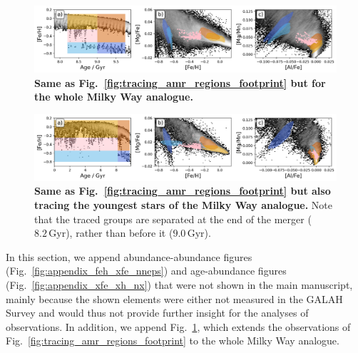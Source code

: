 \documentclass[fleqn,usenatbib]{mnras}
\begin{document}
\begin{figure}
	\includegraphics[width=\textwidth]{figures/tracing_amr_regions_whole.png}
    \caption{
    \textbf{Same as Fig.~\ref{fig:tracing_amr_regions_footprint} but for the whole Milky Way analogue.}
    }
    \label{fig:tracing_amr_regions_whole}
\end{figure}

\begin{figure}
	\includegraphics[width=\textwidth]{figures/tracing_amr_regions_disk.png}
    \caption{
    \textbf{Same as Fig.~\ref{fig:tracing_amr_regions_footprint} but also tracing the youngest stars of the Milky Way analogue.} Note that the traced groups are separated at the end of the merger ($8.2\,\mathrm{Gyr}$), rather than before it ($9.0\,\mathrm{Gyr}$).
    }
    \label{fig:tracing_amr_regions_disk}
\end{figure}

In this section, we append abundance-abundance figures (Fig.~\ref{fig:appendix_feh_xfe_nneps}) and age-abundance figures (Fig.~\ref{fig:appendix_xfe_xh_nx}) that were not shown in the main manuscript, mainly because the shown elements were either not measured in the GALAH Survey and would thus not provide further insight for the analyses of observations. In addition, we append Fig.~\ref{fig:tracing_amr_regions_whole}, which extends the observations of Fig.~\ref{fig:tracing_amr_regions_footprint} to the whole Milky Way analogue.
\label{lastpage}
\end{document}
